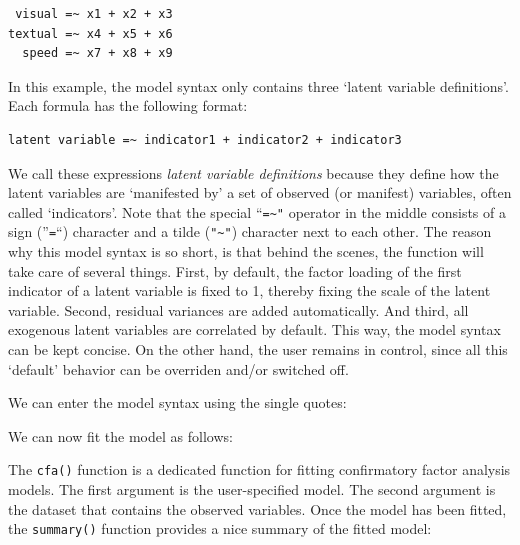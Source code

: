 \begin{verbatim}
 visual =~ x1 + x2 + x3
textual =~ x4 + x5 + x6
  speed =~ x7 + x8 + x9
\end{verbatim}

In this example, the model syntax only contains three `latent variable
definitions'. Each formula has the following format:

\begin{verbatim}
latent variable =~ indicator1 + indicator2 + indicator3
\end{verbatim}

We call these expressions \emph{latent variable definitions} because
they define how the latent variables are `manifested by' a set of
observed (or manifest) variables, often called `indicators'. Note that
the special ``\texttt{=\textasciitilde{}"} operator in the middle
consists of a sign (''\texttt{=}``) character and a tilde
(\texttt{"\textasciitilde{}"}) character next to each other. The reason
why this model syntax is so short, is that behind the scenes, the
function will take care of several things. First, by default, the factor
loading of the first indicator of a latent variable is fixed to 1,
thereby fixing the scale of the latent variable. Second, residual
variances are added automatically. And third, all exogenous latent
variables are correlated by default. This way, the model syntax can be
kept concise. On the other hand, the user remains in control, since all
this `default' behavior can be overriden and/or switched off.

We can enter the model syntax using the single quotes:

\begin{Shaded}
\begin{Highlighting}[]
\end{Highlighting}
\end{Shaded}

We can now fit the model as follows:

\begin{Shaded}
\begin{Highlighting}[]
\StringTok{ }
\end{Highlighting}
\end{Shaded}

The \texttt{cfa()} function is a dedicated function for fitting
confirmatory factor analysis models. The first argument is the
user-specified model. The second argument is the dataset that contains
the observed variables. Once the model has been fitted, the
\texttt{summary()} function provides a nice summary of the fitted model:

